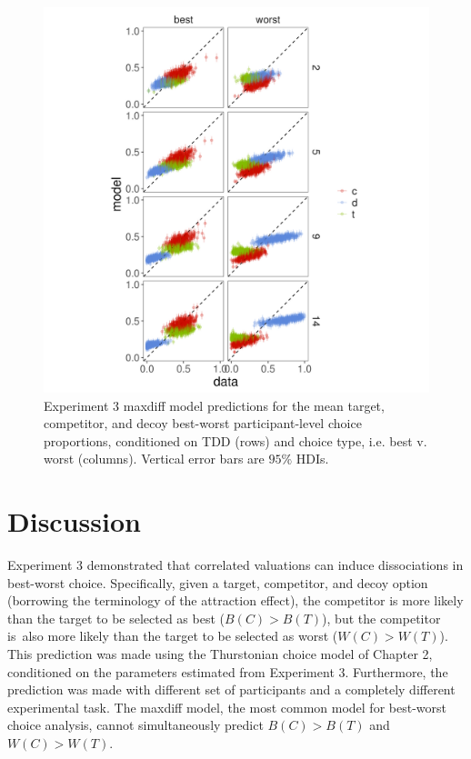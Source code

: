 \begin{figure}
   \includegraphics[width=\linewidth]{figures/maxdiff_1_subjectmeans_model_v_data.jpeg}
   \caption{Experiment 3 maxdiff model predictions for the mean target, competitor, and decoy best-worst participant-level choice proportions, conditioned on TDD (rows) and choice type, i.e. best v. worst (columns). Vertical error bars are $95\%$ HDIs.}
   \label{fig:maxdiff_sub_preds}
\end{figure}

\section{Discussion}
Experiment 3 demonstrated that correlated valuations can induce dissociations in best-worst choice. Specifically, given a target, competitor, and decoy option (borrowing the terminology of the attraction effect), the competitor is more likely than the target to be selected as best ($B(C)>B(T)$), but the competitor is\ also more likely than the target to be selected as worst ($W(C)>W(T)$). This prediction was made using the Thurstonian choice model of Chapter 2, conditioned on the parameters estimated from Experiment 3. Furthermore, the prediction was made with different set of participants and a completely different experimental task. The maxdiff model, the most common model for best-worst choice analysis, cannot simultaneously predict $B(C)>B(T)$ and $W(C)>W(T)$.  

